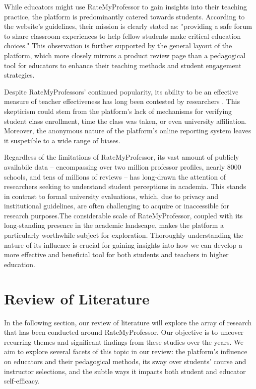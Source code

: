 \documentclass[man,12pt]{apa7}
\begin{document}
While educators might use RateMyProfessor to gain insights into their teaching practice, the platform is predominantly catered towards students. According to the website's guidelines, their mission is clearly stated as: "providing a safe forum to share classroom experiences to help fellow students make critical education choices." This observation is further supported by the general layout of the platform, which more closely mirrors a product review page than a pedagogical tool for educators to enhance their teaching methods and student engagement strategies.

Despite RateMyProfessors' continued popularity, its ability to be an effective measure of teacher effectiveness has long been contested by researchers \textcite{rosen_correlations_2018}. This skepticism could stem from the platform's lack of mechanisms for verifying student class enrollment, time the class was taken, or even university affiliation. Moreover, the anonymous nature of the platform's online reporting system leaves it suspetible to a wide range of biases.

Regardless of the limitations of RateMyProfessor, its vast amount of publicly availabile data -- encompassing over two million professor profiles, nearly 8000 schools, and tens of millions of reviews -- has long-drawn the attention of researchers seeking to understand student perceptions in academia. This stands in contrast to formal university evaluations, which, due to privacy and institutional guidelines, are often challenging to acquire or inaccessible for research purposes.The considerable scale of RateMyProfessor, coupled with its long-standing presence in the academic landscape, makes the platform a particularly worthwhile subject for exploration. Thoroughly understanding the nature of its influence is crucial for gaining insights into how we can develop a more effective and beneficial tool for both students and teachers in higher education.

\section{Review of Literature}
In the following section, our review of literature will explore the array of research that has been conducted around RateMyProfessor. Our objective is to uncover recurring themes and significant findings from these studies over the years. We aim to explore several facets of this topic in our review: the platform’s influence on educators and their pedagogical methods, its sway over students' course and instructor selections, and the subtle ways it impacts both student and educator self-efficacy.
\end{document}
